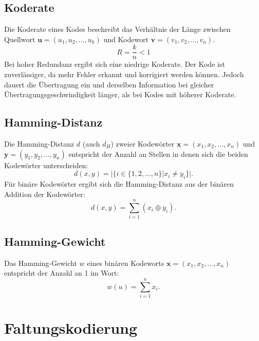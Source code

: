 \subsection{Koderate}
\label{kapitel:grundlagen_koderate}
Die Koderate eines Kodes beschreibt das Verhältnis der Länge zwischen Quellwort $\mathbf{u}=(u_{1},u_{2},\dots ,u_{k})$ und Kodewort $\mathbf{v}=(v_{1},v_{2},\dots ,v_{n})$.
\begin{equation}
R=\frac{k}{n}<1
\end{equation}
Bei hoher Redundanz ergibt sich eine niedrige Koderate. Der Kode ist zuverlässiger, da mehr Fehler erkannt und korrigiert werden können. Jedoch dauert die Übertragung ein und derselben Information bei gleicher Übertragungsgeschwindigkeit länger, als bei Kodes mit höherer Koderate.

\subsection{Hamming-Distanz}
\label{kapitel:grundlagen_hamming_distanz}
Die Hamming-Distanz $d$ (auch $d_{H}$) zweier Kodewörter $\mathbf{x}=(x_{1},x_{2},\dots ,x_{n})$ und $\mathbf{y}=(y_{1},y_{2},\dots ,y_{n})$ entspricht der Anzahl an Stellen in denen sich die beiden Kodewörter unterscheiden:
\begin{equation}
d(x,y)=\vert\lbrace i \in \lbrace 1,2,\dots ,n \rbrace\vert x_{i}\neq y_{i}\rbrace\vert.
\end{equation}
Für binäre Kodewörter ergibt sich die Hamming-Distanz aus der binären Addition der Kodewörter:
\begin{equation}
d(x,y)=\sum_{i=1}^{n} (x_{i} \oplus y_{i}).
\end{equation}

\subsection{Hamming-Gewicht}
\label{kapitel:grundlagen_hamming_gewicht}
Das Hamming-Gewicht $w$ eines binären Kodeworts $\mathbf{x}=(x_{1},x_{2},\dots ,x_{n})$ entspricht der Anzahl an 1 im Wort:
\begin{equation}
w(u)=\sum_{i=1}^{n} x_{i}.
\end{equation}

\section{Faltungskodierung}
\label{kapitel:grundlagen_faltungskodierung}

